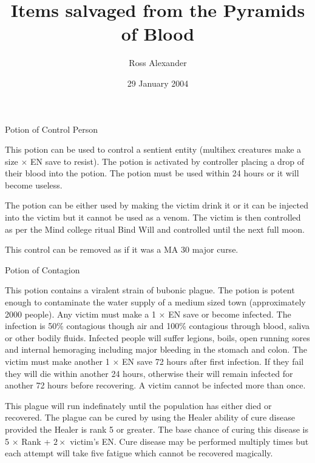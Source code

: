 \documentclass[a4paper]{article}
\title{Items salvaged from the Pyramids of Blood}
\author{Ross Alexander}
\date{29 January 2004}
\begin{document}
\maketitle

\begin{ep-box}{Potion of Control Person}

This potion can be used to control a sentient entity (multihex
creatures make a size $\times$ EN save to resist).  The potion is
activated by controller placing a drop of their blood into the potion.
The potion must be used within 24 hours or it will become useless.

The potion can be either used by making the victim drink it or it can
be injected into the victim but it cannot be used as a venom.  The victim
is then controlled as per the Mind college ritual Bind Will and controlled
until the next full moon.

This control can be removed as if it was a MA 30 major curse.
\end{ep-box}



\begin{ep-box}{Potion of Contagion}

This potion contains a viralent strain of bubonic plague.  The potion
is potent enough to contaminate the water supply of a medium sized
town (approximately 2000 people).  Any victim must make a 1 $\times$
EN save or become infected.  The infection is 50\% contagious though
air and 100\% contagious through blood, saliva or other bodily fluids.
Infected people will suffer legions, boils, open running sores and
internal hemoraging including major bleeding in the stomach and colon.
The victim must make another 1 $\times$ EN save 72 hours after first
infection.  If they fail they will die within another 24 hours,
otherwise their will remain infected for another 72 hours before
recovering.  A victim cannot be infected more than once.

This plague will run indefinately until the population has either died
or recovered.  The plague can be cured by using the Healer ability of
cure disease provided the Healer is rank 5 or greater.  The base
chance of curing this disease is 5 $\times$ Rank + $2 \times$ victim's
EN.  Cure disease may be performed multiply times but each attempt
will take five fatigue which cannot be recovered magically.
\end{ep-box}

\end{document}
